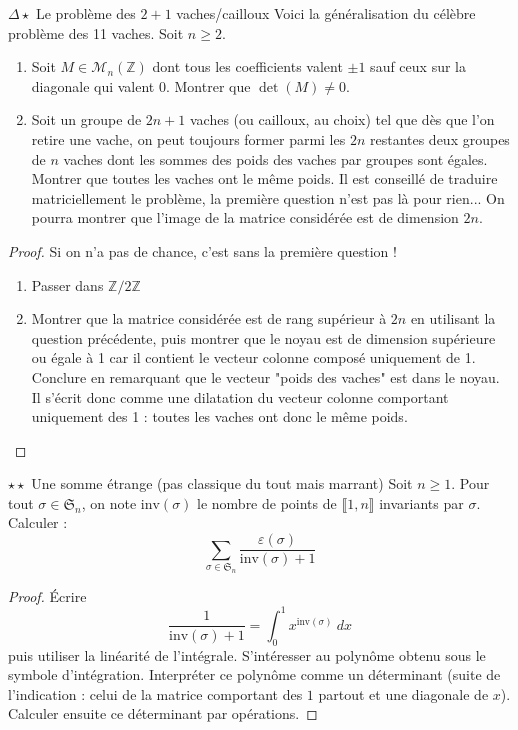 \documentclass[french,a4paper]{article}
\newcommand{\Z}{\mathbb{Z}}
\theoremstyle{plain}
\theoremstyle{definition}
\theoremstyle{remark}
\begin{document}
\begin{ex}{$\Delta\star$ Le problème des $2+1$ vaches/cailloux}
	Voici la généralisation du célèbre problème des 11 vaches. Soit $n \ge 2$.
	\begin{enumerate}
		\item Soit $M \in \mathcal{M}_n(\Z)$ dont tous les coefficients valent $\pm1$ sauf ceux sur la diagonale qui valent 0. Montrer que $\det(M) \ne 0$.
		\item Soit un groupe de $2n+1$ vaches (ou cailloux, au choix) tel que dès que l'on retire une vache, on peut toujours former parmi les $2n$ restantes deux groupes de $n$ vaches dont les sommes des poids des vaches par groupes sont égales. Montrer que toutes les vaches ont le même poids. Il est conseillé de traduire matriciellement le problème, la première question n'est pas là pour rien... On pourra montrer que l'image de la matrice considérée est de dimension $2n$.
	\end{enumerate}
\end{ex}
\begin{proof}
	Si on n'a pas de chance, c'est sans la première question !
	\begin{enumerate}
		\item Passer dans $\Z/2\Z$
		\item Montrer que la matrice considérée est de rang supérieur à $2n$ en utilisant la question précédente, puis montrer que le noyau est de dimension supérieure ou égale à 1 car il contient le vecteur colonne composé uniquement de 1. Conclure en remarquant que le vecteur "poids des vaches" est dans le noyau. Il s'écrit donc comme une dilatation du vecteur colonne comportant uniquement des 1 : toutes les vaches ont donc le même poids.
	\end{enumerate}
\end{proof}
\begin{ex}{$\star\star$ Une somme étrange (pas classique du tout mais marrant)}
	Soit $n\geqslant1$. Pour tout $\sigma\in\mathfrak{S}_n$, on note $\text{inv}(\sigma)$ le nombre de points de $\llbracket1,n\rrbracket$ invariants par $\sigma$. Calculer : $$\sum_{\sigma\in\mathfrak{S}_n}\frac{\varepsilon(\sigma)}{\text{inv}(\sigma)+1}$$
\end{ex}
\begin{proof}
	Écrire $$\displaystyle\frac{1}{\text{inv}(\sigma)+1}=\int_{0}^{1}x^{\text{inv}(\sigma)}\ dx$$ puis utiliser la linéarité de l'intégrale. S'intéresser au polynôme obtenu sous le symbole d'intégration. Interpréter ce polynôme comme un déterminant (suite de l'indication : celui de la matrice comportant des $1$ partout et une diagonale de $x$). Calculer ensuite ce déterminant par opérations.
\end{proof}
\end{document}
